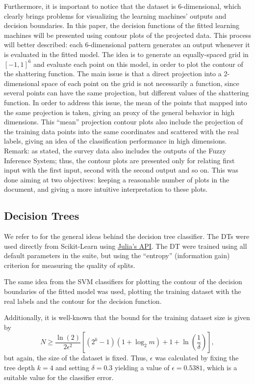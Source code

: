 \documentclass[conference]{IEEEtran}
\theoremstyle{definition}
\theoremstyle{remark}
\theoremstyle{remark}
\begin{document}
Furthermore, it is important to notice that the dataset is 6-dimensional, which
clearly brings problems for visualizing the learning machines' outputs and
decision boundaries. In this paper, the decision functions of the fitted
learning machines will be presented using contour plots of the projected data.
This process will better described: each 6-dimensional pattern generates an
output whenever it is evaluated in the fitted model. The idea is to generate an
equally-spaced grid in $[-1,1]^6$ and evaluate each point on this model, in
order to plot the contour of the shattering function. The main issue is that a
direct projection into a 2-dimensional space of each point on the grid is not
necessarily a function, since several points can have the same projection, but
different values of the shattering function. In order to address this issue, the
mean of the points that mapped into the same projection is taken, giving an
proxy of the general behavior in high dimensions. This ``mean'' projection
contour plots also include the projection of the training data points into the
same coordinates and scattered with the real labels, giving an idea of the
classification performance in high dimensions. Remark: as stated, the survey
data also includes the outputs of the Fuzzy Inference System; thus, the contour
plots are presented only for relating first input with the first input, second
with the second output and so on. This was done aiming at two objectives:
keeping a reasonable number of plots in the document, and giving a more
intuitive interpretation to these plots.

\subsection{Decision Trees}
We refer to \textcite{bramer2007} for the general ideas behind the decision tree
classifier. The DTs were used directly from Scikit-Learn
\parencite{scikit-learn, sklearn_api} using
\href{https://bit.ly/3lDHADX}{Julia's API}. The DT were trained using all
default parameters in the suite, but using the ``entropy'' (information gain)
criterion for measuring the quality of splits.

The same idea from the SVM classifiers for plotting the contour of the decision
boundaries of the fitted model was used, plotting the training dataset with the
real labels and the contour for the decision function.

Additionally, it is well-known that the bound for the training dataset size is
given by
%
\begin{equation}
  N\geq \dfrac{\ln(2)}{2\epsilon^2}\left[(2^k-1)(1+\log_2 m) + 1 + \ln\left(
      \dfrac{1}{\delta}\right)\right],
\end{equation}
%
but again, the size of the dataset is fixed. Thus, $\epsilon$ was calculated by
fixing the tree depth $k=4$ and setting $\delta=0.3$ yielding a value of
$\epsilon=0.5381$, which is a suitable value for the classifier error.
\end{document}
